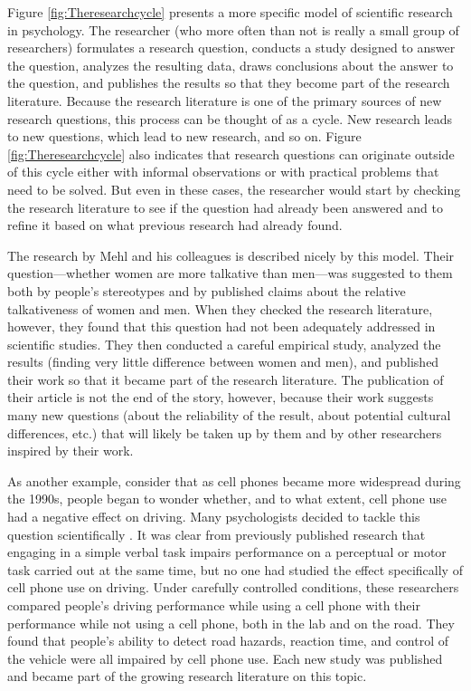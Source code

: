 Figure \ref{fig:Theresearchcycle} presents a more specific model of scientific research in psychology. The researcher (who more often than not is really a small group of researchers) formulates a research question, conducts a study designed to answer the question, analyzes the resulting data, draws conclusions about the answer to the question, and publishes the results so that they become part of the research literature. Because the research literature is one of the primary sources of new research questions, this process can be thought of as a cycle. New research leads to new questions, which lead to new research, and so on. Figure \ref{fig:Theresearchcycle} also indicates that research questions can originate outside of this cycle either with informal observations or with practical problems that need to be solved. But even in these cases, the researcher would start by checking the research literature to see if the question had already been answered and to refine it based on what previous research had already found.

The research by Mehl and his colleagues is described nicely by this model. Their question---whether women are more talkative than men---was suggested to them both by people's stereotypes and by published claims about the relative talkativeness of women and men. When they checked the research literature, however, they found that this question had not been adequately addressed in scientific studies. They then conducted a careful empirical study, analyzed the results (finding very little difference between women and men), and published their work so that it became part of the research literature. The publication of their article is not the end of the story, however, because their work suggests many new questions (about the reliability of the result, about potential cultural differences, etc.) that will likely be taken up by them and by other researchers inspired by their work.

As another example, consider that as cell phones became more widespread during the 1990s, people began to wonder whether, and to what extent, cell phone use had a negative effect on driving. Many psychologists decided to tackle this question scientifically \citep{collet_phoning_2010}. It was clear from previously published research that engaging in a simple verbal task impairs performance on a perceptual or motor task carried out at the same time, but no one had studied the effect specifically of cell phone use on driving. Under carefully controlled conditions, these researchers compared people's driving performance while using a cell phone with their performance while not using a cell phone, both in the lab and on the road. They found that people's ability to detect road hazards, reaction time, and control of the vehicle were all impaired by cell phone use. Each new study was published and became part of the growing research literature on this topic.

